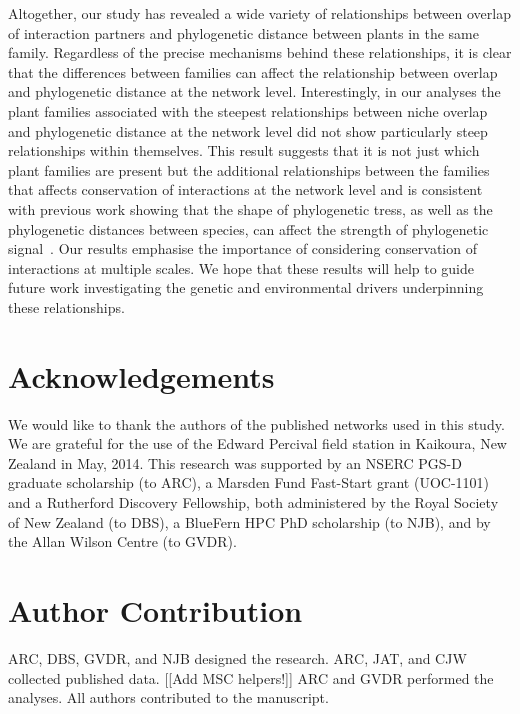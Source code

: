 \documentclass[12pt]{article}
\begin{document}
\begin{spacing}{1.5}
  Altogether, our study has revealed a wide variety of relationships 
  between overlap of interaction partners and phylogenetic distance 
  between plants in the same family. Regardless of the precise mechanisms
  behind these relationships, it is clear
  that the differences between families can affect the relationship
  between overlap and phylogenetic distance at the network level. 
  Interestingly, in our analyses the plant families associated with
  the steepest relationships between niche overlap and phylogenetic
  distance at the network level did not show particularly steep
  relationships within themselves. This result suggests
  that it is not just which plant families are present but the additional 
  relationships between the families that affects conservation of
  interactions at the network level and is consistent with previous
  work showing that the shape of phylogenetic tress, as well as the
  phylogenetic distances between species, can affect the strength
  of phylogenetic signal~\citep{Chamberlain2014a}. Our results 
  emphasise the importance of considering conservation of interactions at multiple scales.
  We hope that these results will help to guide future work investigating
  the genetic and environmental drivers underpinning these relationships.


\section*{Acknowledgements}

  We would like to thank the authors of the published networks used in this study. 
  We are grateful for the use of the Edward Percival field station in Kaikoura, 
  New Zealand in May, 2014. This research was supported by an NSERC PGS-D 
  graduate scholarship (to ARC), a Marsden Fund Fast-Start grant (UOC-1101) and a 
  Rutherford Discovery Fellowship, both administered by the Royal Society of New 
  Zealand (to DBS), a BlueFern HPC PhD scholarship (to NJB), and by
  the Allan Wilson Centre (to GVDR).


\section*{Author Contribution}

  ARC, DBS, GVDR, and NJB designed the research. ARC, JAT, and CJW collected published data. [[Add MSC helpers!]]
  ARC and GVDR performed the analyses. All authors contributed to the manuscript.

\end{spacing}
\end{document}
